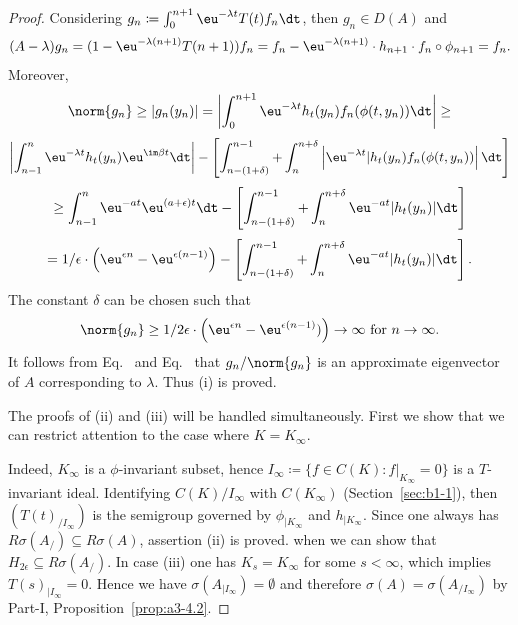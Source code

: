 \begin{proof}
	Considering $g_{n}\coloneq \int_{0}^{n+1} \eu^{-\lambda t} T(t)f_{n} \dt$, then $g_{n} \in D(A)$ and
	\begin{equation}\label{eq:b3-4.7}
		(A - \lambda)g_{n} = (1 - \eu^{-\lambda(n+1)}T(n+1))f_{n} = f_{n} - \eu^{-\lambda(n+1)} \cdot h_{n+1} \cdot f_{n} \circ \phi_{n+1} = f_{n}.
	\end{equation}
	Moreover,
	\[\norm{g_{n}} \geq |g_{n}(y_{n})| = \left|\int_{0}^{n+1} \eu^{-\lambda t} h_{t}(y_{n})f_{n}(\phi(t,y_{n})) \dt \right| \geq\]
	\[\left|\int_{n-1}^{n} \eu^{-\lambda t} h_{t}(y_{n}) \eu^{\im\beta  t} \dt\right| - \left[\int_{n-(1+\delta)}^{n-1} + \int_{n}^{n+\delta}\left| \eu^{-\lambda t}|h_{t}(y_{n})f_{n}(\phi(t,y_{n}))\right| \dt\right]\]
	\[\geq \int_{n-1}^{n} \eu^{-at} \eu^{(a+\epsilon)t} \dt - \left[\int_{n-(1+\delta)}^{n-1} + \int_{n}^{n+\delta} \eu^{-at}|h_{t}(y_{n})| \dt\right]\]
	\[= 1/\epsilon \cdot\left(\eu^{\epsilon n} - \eu^{\epsilon(n-1)}\right) - \left[\int_{n-(1+\delta)}^{n-1} + \int_{n}^{n+\delta} \eu^{-at}|h_{t}(y_{n})| \dt\right].\]
	The constant $\delta$ can be chosen such that
	\begin{equation}\label{eq:b3-4.8}
		\norm{g_{n}} \geq 1/2\epsilon \cdot\left(\eu^{\epsilon n} - \eu^{\epsilon(n-1)})\right) \to \infty \text{ for } n \to \infty.
	\end{equation}
	It follows from Eq.~ and Eq.~ that $ g_n / \norm{g_n}$ is an approximate
	eigenvector of\/ $A$ corresponding to $\lambda$. 
    Thus (i) is proved. 
	
	The 
	proofs of (ii) and (iii) will be handled simultaneously. 
    First we show that we can restrict attention to the case where $K = K_\infty$.
	
	Indeed, $K_{\infty}$ is a $\phi$-invariant subset, hence $I_{\infty}\coloneq \{f \in C(K) \colon f|_{K_{\infty}} = 0\}$ is a $T$-invariant ideal.
	Identifying $C(K)/I_{\infty}$ with $C(K_{\infty})$ (\cf Section~\ref{sec:b1-1}), then $(T(t)_{/I_{\infty}})$ is the semigroup governed by $\phi_{|K_{\infty}}$ and $h_{|K_{\infty}}$.
	Since one always has $R{\sigma}(A_{/}) \subseteq R{\sigma}(A)$, assertion (ii) is proved.
	when we can show that $H_{2\epsilon} \subseteq R{\sigma}(A_{/})$.
	In case (iii) one has $K_{s} = K_{\infty}$ for some $s < \infty$, which implies $T(s)_{|I_{\infty}} = 0$.
	Hence we have $\sigma(A_{|I_{\infty}}) = \emptyset$ and therefore $\sigma(A) = \sigma(A_{/I_{\infty}})$ by Part-I, Proposition~\ref{prop:a3-4.2}.
	

\end{proof}
